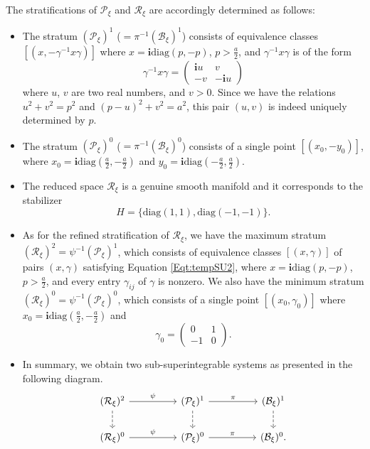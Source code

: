 \documentclass[12pt]{amsart}
\theoremstyle{definition}
\numberwithin{equation}{section}
\def\diag{\mathrm{diag}}
\newcommand{\imagunit}{\mathbf{i}}
\newcommand{\Reducedxi}{\mathcal{R}_\xi}
\newcommand{\SET}[1]{\{#1\}}
\newcommand{\Pxi}{\mathcal{P}_{\xi}}
\newcommand{\Bxi}{\mathcal{B}_{\xi}}
\begin{document}
\begin{itemize}
      
      The stratifications of $\Pxi $ and $\Reducedxi $ are accordingly determined as follows:
      \begin{itemize}
        \item[$\bullet$]  The stratum $ (\Pxi)^1$ ($=\pi^{-1}(\Bxi)^1$) consists of    equivalence classes  $[(x,-\gamma^{-1}x\gamma)]$ where $x  =\imagunit \diag(p,-p)$, $ p>\frac{a}{2}$, and 
 $\gamma^{-1}x\gamma$ is of the form
 $$\gamma^{-1}x\gamma=\begin{pmatrix}
		 \imagunit u    & v    \\
		-v 		    &  -\imagunit u	 
	\end{pmatrix}
 $$  
 where $u$, $v$ are two real numbers, and $v>0$. Since  we have the relations $u^2+v^2=p^2$ and $(p-u)^2+v^2=a^2$, this pair $(u,v)$ is indeed uniquely determined by $p$.
 \item[$\bullet$] The stratum $(\Pxi)^0$ ($=\pi^{-1}(\Bxi)^0$) consists of a single point  $[(x_0,-y_0)] $, where $x_0=\imagunit \diag(\frac{a}{2},-\frac{a}{2})$ and $y_0=\imagunit \diag(-\frac{a}{2}, \frac{a}{2})$.
     \item[$\bullet$] The reduced space $\Reducedxi $ is a genuine smooth manifold and it corresponds to the stabilizer $$H=\SET{\diag(1,1),\diag(-1,-1)} .$$
 \item[$\bullet$] As for the refined stratification of $\Reducedxi $, we have the maximum stratum $(\Reducedxi) ^2=\psi^{-1}(\Pxi) ^1$,    which consists of equivalence classes $[(x,\gamma)]$ of  pairs $(x,\gamma)$ satisfying Equation \eqref{Eqt:tempSU2},   where $x=\imagunit \diag(p,-p)$, $p>\frac{a}{2}$, and every entry $\gamma_{ij} $ of $\gamma$ is nonzero.  We also have the minimum stratum $(\Reducedxi) ^0=\psi^{-1}(\Pxi) ^0$, which  consists of a single point  $[(x_0,\gamma_0)]$     where $x_0=\imagunit \diag(\frac{a}{2},-\frac{a}{2})$   and   $$\gamma_0= \begin{pmatrix}
		 0    & 1    \\
		-1 		    &  0	 
	\end{pmatrix}.$$
\item[$\bullet$]
In summary, we obtain   two sub-superintegrable systems as presented in the following diagram.
\begin{equation}
	\label{Diagram:SU2arrows000NEW}
	\begin{tikzcd}
		(\Reducedxi)^2   \arrow[d,dashed] \arrow[rr,"\psi"] && (\Pxi)^1      \arrow[d,dashed] \arrow[rr ,"\pi"]   && (\Bxi)^1  \arrow[d,dashed]   \\
		(\Reducedxi)^0  \arrow[rr,"\psi" ] && (\Pxi)^0    \arrow[rr,"\pi" ]  && (\Bxi)^0  .  
	\end{tikzcd}
\end{equation}



      \end{itemize}
\end{itemize}
\end{document}
